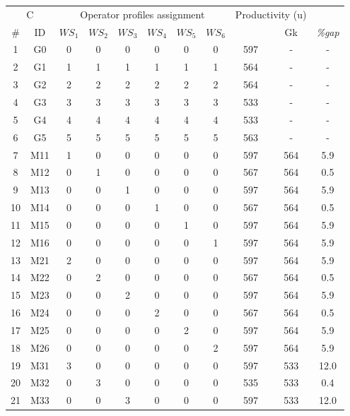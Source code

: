 \documentclass[review,12pt, 3p, times]{elsarticle}
\begin{document}
\setcounter{table}{0}
\begin{table}[htbp]
    \begin{center}
        \begin{longtable}{|cc|cccccc|ccc|}
	    \hline
	    \multicolumn{2}{|c|}{C} & \multicolumn{6}{c|}{Operator profiles assignment}& \multicolumn{2}{c}{Productivity (u)}&\\
            \# & ID  & $\textit{WS}_1$ & $\textit{WS}_2$ & $\textit{WS}_3$ & $\textit{WS}_4$ & $\textit{WS}_5$ & $\textit{WS}_6$ & 
			& Gk   & \it{\%gap} \\ 
			\hline
			1  & G0  & 0 & 0 & 0 & 0 & 0 & 0 & 597 & -   & -    \\
			2  & G1  & 1 & 1 & 1 & 1 & 1 & 1 & 564 & -   & -    \\
			3  & G2  & 2 & 2 & 2 & 2 & 2 & 2 & 564 & -   & -    \\
			4  & G3  & 3 & 3 & 3 & 3 & 3 & 3 & 533 & -   & -    \\
			5  & G4  & 4 & 4 & 4 & 4 & 4 & 4 & 533 & -   & -    \\
			6  & G5  & 5 & 5 & 5 & 5 & 5 & 5 & 563 & -   & -    \\
			\hline
			7  & M11 & 1 & 0 & 0 & 0 & 0 & 0 & 597 & 564 & 5.9  \\
			8  & M12 & 0 & 1 & 0 & 0 & 0 & 0 & 567 & 564 & 0.5  \\
			9  & M13 & 0 & 0 & 1 & 0 & 0 & 0 & 597 & 564 & 5.9  \\
			10 & M14 & 0 & 0 & 0 & 1 & 0 & 0 & 567 & 564 & 0.5  \\
			11 & M15 & 0 & 0 & 0 & 0 & 1 & 0 & 597 & 564 & 5.9  \\
			12 & M16 & 0 & 0 & 0 & 0 & 0 & 1 & 597 & 564 & 5.9  \\
			\hline
			13 & M21 & 2 & 0 & 0 & 0 & 0 & 0 & 597 & 564 & 5.9  \\
			14 & M22 & 0 & 2 & 0 & 0 & 0 & 0 & 567 & 564 & 0.5  \\
			15 & M23 & 0 & 0 & 2 & 0 & 0 & 0 & 597 & 564 & 5.9  \\
			16 & M24 & 0 & 0 & 0 & 2 & 0 & 0 & 567 & 564 & 0.5  \\
			17 & M25 & 0 & 0 & 0 & 0 & 2 & 0 & 597 & 564 & 5.9  \\
			18 & M26 & 0 & 0 & 0 & 0 & 0 & 2 & 597 & 564 & 5.9  \\
			\hline
			19 & M31 & 3 & 0 & 0 & 0 & 0 & 0 & 597 & 533 & 12.0 \\
			20 & M32 & 0 & 3 & 0 & 0 & 0 & 0 & 535 & 533 & 0.4  \\
			21 & M33 & 0 & 0 & 3 & 0 & 0 & 0 & 597 & 533 & 12.0 \\

\end{longtable}
\end{center}
\end{table}
\end{document}
